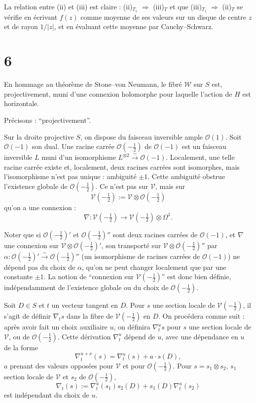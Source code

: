 \documentclass[12pt,a4paper]{article}
\theoremstyle{plain}
\theoremstyle{definition}
\theoremstyle{remark}
\begin{document}
La relation entre (ii) et (iii) est claire : (ii)$_{T_1}$ $\Rightarrow$ (iii)$_T$ et que (iii)$_{T_1}$ $\Rightarrow$ (ii)$_T$ se vérifie en écrivant $f(z)$ comme moyenne de ses valeurs sur un disque de centre $z$ et de rayon $1/|z|$, et en évaluant cette moyenne par Cauchy--Schwarz.

\section*{6}

En hommage au théorème de Stone--von Neumann, le fibré $\mathscr{W}$ sur $S$ est, projectivement, muni d'une connexion holomorphe pour laquelle l'action de $H$ est horizontale.

Précisons : ``projectivement''.

Sur la droite projective $S$, on dispose du faisceau inversible ample $\mathcal{O}(1)$. Soit $\mathcal{O}(-1)$ son dual. Une racine carrée $\mathcal{O}(-\frac{1}{2})$ de $\mathcal{O}(-1)$ est un faisceau inversible $L$ muni d'un isomorphisme $L^{\otimes 2} \xrightarrow{\sim} \mathcal{O}(-1)$. Localement, une telle racine carrée existe et, localement, deux racines carrées sont isomorphes, mais l'isomorphisme n'est pas unique : ambiguité $\pm 1$. Cette ambiguité obstrue l'existence globale de $\mathcal{O}(-\frac{1}{2})$. Ce n'est pas sur $\mathscr{V}$, mais sur
\begin{equation}\label{eq:6.1}
\mathscr{V}(-\tfrac{1}{2}) := \mathscr{V} \otimes \mathcal{O}(-\tfrac{1}{2})\tag{6.1}
\end{equation}
qu'on a une connexion :
\[\nabla \colon \mathscr{V}(-\tfrac{1}{2}) \to \mathscr{V}(-\tfrac{1}{2}) \otimes \Omega^1.\]

Noter que si $\mathcal{O}(-\frac{1}{2})'$ et $\mathcal{O}(-\frac{1}{2})''$ sont deux racines carrées de $\mathcal{O}(-1)$, et $\nabla$ une connexion sur $\mathscr{V} \otimes \mathcal{O}(-\frac{1}{2})'$, son transporté sur $\mathscr{V} \otimes \mathcal{O}(-\frac{1}{2})''$ par $\alpha \colon \mathcal{O}(-\frac{1}{2})' \xrightarrow{\sim} \mathcal{O}(-\frac{1}{2})''$ (un isomorphisme de racines carrées de $\mathcal{O}(-1)$) ne dépend pas du choix de $\alpha$, qu'on ne peut changer localement que par une constante $\pm 1$. La notion de ``connexion sur $\mathscr{V}(-\frac{1}{2})$'' est donc bien définie, indépendamment de l'existence globale ou du choix de $\mathcal{O}(-\frac{1}{2})$.

Soit $D \in S$ et $t$ un vecteur tangent en $D$. Pour $s$ une section locale de $\mathscr{V}(-\frac{1}{2})$, il s'agit de définir $\nabla_t s$ dans la fibre de $\mathscr{V}(-\frac{1}{2})$ en $D$. On procédera comme suit : après avoir fait un choix auxiliaire $u$, on définira $\nabla_t^u s$ pour $s$ une section locale de $\mathscr{V}$, ou de $\mathcal{O}(-\frac{1}{2})$. Cette dérivation $\nabla_t^u$ dépend de $u$, avec une dépendance en $u$ de la forme
\[\nabla_t^{u+x}(s) = \nabla_t^u(s) + a \cdot s(D),\]
$a$ prenant des valeurs opposées pour $\mathscr{V}$ et pour $\mathcal{O}(-\frac{1}{2})$. Pour $s = s_1 \otimes s_2$, $s_1$ section locale de $\mathscr{V}$ et $s_2$ de $\mathcal{O}(-\frac{1}{2})$,
\[\nabla_t(s) := \nabla_t^u(s_1)s_2(D) + s_1(D)\nabla_t^u(s_2)\]
est indépendant du choix de $u$.
\end{document}
